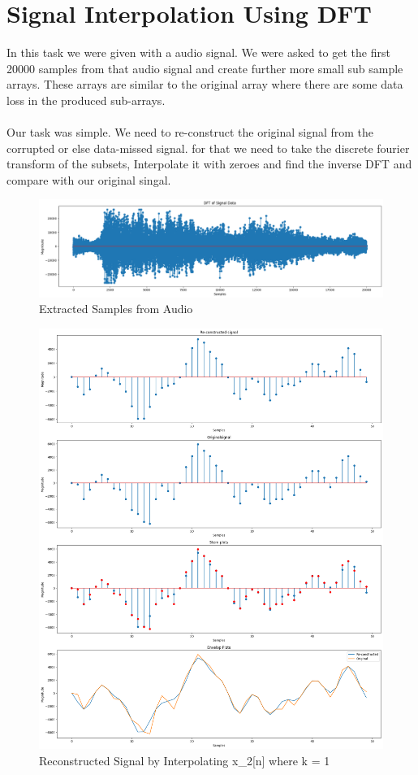 \documentclass[11pt,a4paper]{article}
\begin{document}
\newpage

\section{Signal Interpolation Using DFT}

In this task we were given with a audio signal. We were asked to get the first 20000 samples 
from that audio signal and create further more small sub sample arrays. These arrays are similar
to the original array where there are some data loss in the produced sub-arrays.
\\
\\
Our task was simple. We need to re-construct the original signal from the corrupted or else data-missed signal.
for that we need to take the discrete fourier transform of the subsets, Interpolate it with zeroes and find the inverse
DFT and compare with our original singal.


{\begin{figure}[h]
    \centering
    \includegraphics[width=1.0\linewidth]{images/4.png}
    \caption{Extracted Samples from Audio}
\end{figure}}

{\begin{figure}[h]
    \centering
    \includegraphics[width=1.0\linewidth]{images/5-1.png}
    \caption{Reconstructed Signal by Interpolating x\_2[n] where k = 1}
\end{figure}}
\end{document}
